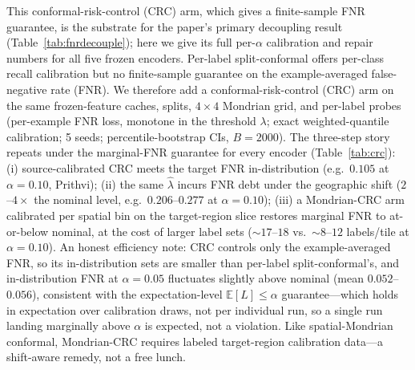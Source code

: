 \documentclass[11pt]{article}
\begin{document}
This conformal-risk-control (CRC) arm, which gives a finite-sample FNR guarantee, is the substrate for the
paper's primary decoupling result (Table~\ref{tab:fnrdecouple}); here we give its full per-$\alpha$
calibration and repair numbers for all five frozen encoders. Per-label split-conformal offers per-class
recall calibration but no finite-sample guarantee on the example-averaged false-negative rate (FNR). We
therefore add a conformal-risk-control (CRC) arm \citep{angelopoulos2024crc} on the same frozen-feature caches, splits,
$4\times4$ Mondrian grid, and per-label probes (per-example FNR loss, monotone in the threshold $\lambda$;
exact weighted-quantile calibration; 5 seeds; percentile-bootstrap CIs, $B{=}2000$). The three-step story
repeats under the marginal-FNR guarantee for every encoder (Table~\ref{tab:crc}): (i) source-calibrated CRC meets the
target FNR in-distribution (e.g.\ $0.105$ at $\alpha{=}0.10$, Prithvi); (ii) the same $\hat\lambda$ incurs
FNR debt under the geographic shift ($2$--$4\times$ the nominal level, e.g.\ $0.206$--$0.277$ at
$\alpha{=}0.10$); (iii) a Mondrian-CRC arm calibrated per spatial bin on the target-region slice restores
marginal FNR to at-or-below nominal, at the cost of larger label sets (${\sim}17$--$18$ vs.\
${\sim}8$--$12$ labels/tile at $\alpha{=}0.10$). An honest efficiency note: CRC controls only the
example-averaged FNR, so its in-distribution sets are smaller than per-label split-conformal's, and
in-distribution FNR at $\alpha{=}0.05$ fluctuates slightly above nominal (mean $0.052$--$0.056$), consistent
with the expectation-level $\mathbb{E}[L]\le\alpha$ guarantee---which holds in expectation over calibration
draws, not per individual run, so a single run landing marginally above $\alpha$ is expected, not a violation. Like spatial-Mondrian conformal, Mondrian-CRC
requires labeled target-region calibration data---a shift-aware remedy, not a free lunch.
\end{document}
